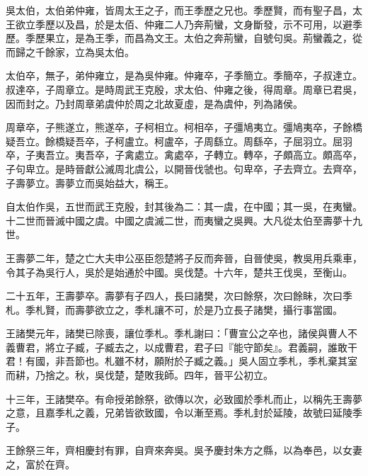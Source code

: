
\begin{pinyinscope}
吳太伯，太伯弟仲雍，皆周太王之子，而王季歷之兄也。季歷賢，而有聖子昌，太王欲立季歷以及昌，於是太佰、仲雍二人乃奔荊蠻，文身斷發，示不可用，以避季歷。季歷果立，是為王季，而昌為文王。太伯之奔荊蠻，自號句吳。荊蠻義之，從而歸之千餘家，立為吳太伯。

太伯卒，無子，弟仲雍立，是為吳仲雍。仲雍卒，子季簡立。季簡卒，子叔達立。叔達卒，子周章立。是時周武王克殷，求太伯、仲雍之後，得周章。周章已君吳，因而封之。乃封周章弟虞仲於周之北故夏虛，是為虞仲，列為諸侯。

周章卒，子熊遂立，熊遂卒，子柯相立。柯相卒，子彊鳩夷立。彊鳩夷卒，子餘橋疑吾立。餘橋疑吾卒，子柯盧立。柯盧卒，子周繇立。周繇卒，子屈羽立。屈羽卒，子夷吾立。夷吾卒，子禽處立。禽處卒，子轉立。轉卒，子頗高立。頗高卒，子句卑立。是時晉獻公滅周北虞公，以開晉伐虢也。句卑卒，子去齊立。去齊卒，子壽夢立。壽夢立而吳始益大，稱王。

自太伯作吳，五世而武王克殷，封其後為二：其一虞，在中國；其一吳，在夷蠻。十二世而晉滅中國之虞。中國之虞滅二世，而夷蠻之吳興。大凡從太伯至壽夢十九世。

王壽夢二年，楚之亡大夫申公巫臣怨楚將子反而奔晉，自晉使吳，教吳用兵乘車，令其子為吳行人，吳於是始通於中國。吳伐楚。十六年，楚共王伐吳，至衡山。

二十五年，王壽夢卒。壽夢有子四人，長曰諸樊，次曰餘祭，次曰餘眛，次曰季札。季札賢，而壽夢欲立之，季札讓不可，於是乃立長子諸樊，攝行事當國。

王諸樊元年，諸樊已除喪，讓位季札。季札謝曰：「曹宣公之卒也，諸侯與曹人不義曹君，將立子臧，子臧去之，以成曹君，君子曰『能守節矣』。君義嗣，誰敢干君！有國，非吾節也。札雖不材，願附於子臧之義。」吳人固立季札，季札棄其室而耕，乃捨之。秋，吳伐楚，楚敗我師。四年，晉平公初立。

十三年，王諸樊卒。有命授弟餘祭，欲傳以次，必致國於季札而止，以稱先王壽夢之意，且嘉季札之義，兄弟皆欲致國，令以漸至焉。季札封於延陵，故號曰延陵季子。

王餘祭三年，齊相慶封有罪，自齊來奔吳。吳予慶封朱方之縣，以為奉邑，以女妻之，富於在齊。


\end{pinyinscope}
